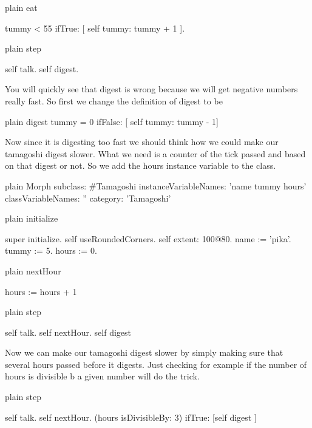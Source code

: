 \documentclass[10pt,twoside,english]{_support/latex/sbabook/sbabook}
\begin{document}
\begin{displaycode}{plain}
eat 

	tummy < 55
		ifTrue: [ self tummy: tummy + 1 ]. 
\end{displaycode}

\begin{displaycode}{plain}
step

	self talk.
	self digest.
\end{displaycode}

You will quickly see that digest is wrong because we will get negative numbers really fast. So first we change 
the definition of digest to be 

\begin{displaycode}{plain}
digest
	tummy = 0 
		ifFalse: [ self tummy: tummy - 1]
\end{displaycode}

Now since it is digesting too fast we should think how we could make our tamagoshi digest slower. What we need is 
a counter of the tick passed and based on that digest or not. So we add the hours instance variable to the class. 

\begin{displaycode}{plain}
Morph subclass: #Tamagoshi
	instanceVariableNames: 'name tummy hours'
	classVariableNames: ''
	category: 'Tamagoshi'
\end{displaycode}

\begin{displaycode}{plain}
initialize

	super initialize. 
	self useRoundedCorners.
	self extent: 100@80.
	name := 'pika'.
	tummy := 5.
	hours := 0.
\end{displaycode}

\begin{displaycode}{plain}
nextHour
	
	hours := hours + 1
\end{displaycode}

\begin{displaycode}{plain}
step

	self talk.
	self nextHour.
	self digest
\end{displaycode}

Now we can make our tamagoshi digest slower by simply making sure that several hours passed before it digests.
Just checking for example if the number of hours is divisible b a given number will do the trick.

\begin{displaycode}{plain}
step

	self talk.
	self nextHour.
	(hours isDivisibleBy: 3)
		ifTrue: [self digest ]
\end{displaycode}
\end{document}
